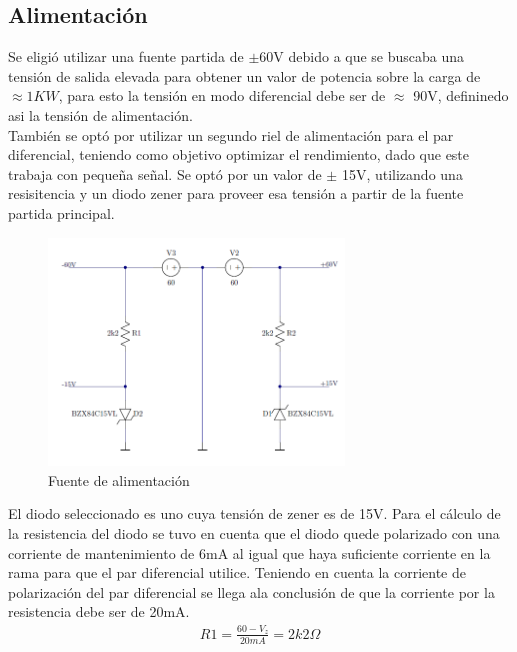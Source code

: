 


\subsection{Alimentación}
Se eligió utilizar una fuente partida de $\pm$60V  debido a que se buscaba una tensión de salida elevada para obtener un valor de potencia sobre la carga de $\approx 1KW$, para esto la tensión en modo diferencial debe ser de $\approx$ 90V, defininedo asi la tensión de alimentación.\\
También se optó por utilizar un segundo riel de alimentación para el par diferencial, teniendo como objetivo optimizar el rendimiento, dado que este trabaja con pequeña señal. Se optó por un valor de $\pm$ 15V, utilizando una resisitencia y un diodo zener para proveer esa tensión a partir de la fuente partida principal.
\begin{figure}[H]
\centering
	\includegraphics[width=0.7\textwidth]{ImagenesAlimentacion/al.png}
	\caption{Fuente de alimentación}
	\label{fig:alimentacion}
\end{figure}
El diodo seleccionado es uno cuya tensión de zener es de 15V.
Para el cálculo de la resistencia del diodo se tuvo en cuenta que el diodo quede polarizado con una corriente de mantenimiento de 6mA al igual que haya suficiente corriente en la rama para que el par diferencial utilice. Teniendo en cuenta la corriente de polarización del par diferencial se llega  ala conclusión de que la corriente por la resistencia debe ser de 20mA.
\begin{align}
R1=\frac{60-V_z}{20mA}= 2k2\Omega
\end{align}
